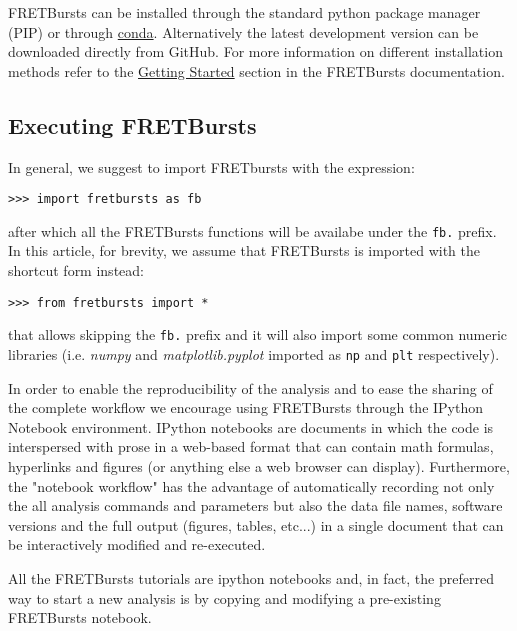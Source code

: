 FRETBursts can be installed through the standard python package manager (PIP)
or through \href{http://conda.pydata.org/docs/}{conda}.
Alternatively the latest development version can be downloaded directly 
from GitHub. For more information on different installation methods refer to the 
\href{http://fretbursts.readthedocs.org/en/latest/getting_started.html}{Getting Started}
section in the FRETBursts documentation.

\subsection{Executing FRETBursts}
\label{sec:import}
In general, we suggest to import FRETbursts with the expression:

\begin{verbatim}
>>> import fretbursts as fb
\end{verbatim}

after which all the FRETBursts functions will be availabe under the \verb|fb.|
prefix. In this article, for brevity, we assume that FRETBursts is imported 
with the shortcut form instead:

\begin{verbatim}
>>> from fretbursts import *
\end{verbatim}

that allows skipping the \verb|fb.| prefix and it will also import some common 
numeric libraries (i.e. \textit{numpy} and \textit{matplotlib.pyplot} 
imported as \verb|np| and \verb|plt| respectively).

In order to enable the reproducibility of the analysis and to ease
the sharing of the complete workflow we encourage using FRETBursts through 
the IPython Notebook environment. 
IPython notebooks are documents in which the code is interspersed with 
prose in a web-based format that can contain math formulas, hyperlinks 
and figures (or anything else a web browser can display).
Furthermore, the "notebook workflow"\cite{Shen_2014} has the advantage 
of automatically recording not only the all analysis commands and parameters 
but also the data file names, software versions and the full output 
(figures, tables, etc...) in a single document that can be interactively 
modified and re-executed.

All the FRETBursts tutorials are 
ipython notebooks and, in fact, the preferred way to start a new analysis is by 
copying and modifying a pre-existing FRETBursts notebook.
